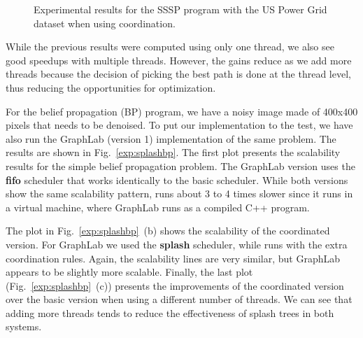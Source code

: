 \begin{figure}[h!]
     \centering
   \caption{Experimental results for the SSSP program with the US Power Grid dataset when using coordination.}
   \label{exp:sssp-uspowergrid}
\end{figure}

While the previous results were computed using only one thread, we also see good speedups with multiple threads. However, the gains reduce as we add
more threads because the decision of picking the best path is done at the thread level, thus reducing the opportunities for optimization.

For the belief propagation (BP) program, we have a noisy image made of 400x400 pixels that needs to be denoised.
To put our implementation to the test, we have also run the GraphLab (version 1) implementation of the same problem. The results are shown
in Fig.~\ref{exp:splashbp}. The first plot presents the scalability results for the simple belief propagation problem. The GraphLab version
uses the \textbf{fifo} scheduler that works identically to the basic \lang scheduler. While both versions show the same scalability pattern,
\lang runs about 3 to 4 times slower since it runs in a virtual machine, where GraphLab runs as a compiled C++ program.

\begin{figure*}[ht]
   \centering
   \caption{Experimental results for belief propagation with coordination using splashes. The dataset is a 400x400 image.}
   \label{exp:splashbp}
\end{figure*}

The plot in Fig.~\ref{exp:splashbp}~(b) shows the scalability of the coordinated version. For GraphLab we used the \textbf{splash} scheduler, while \lang
runs with the extra coordination rules. Again, the scalability lines are very similar, but GraphLab appears to be slightly more scalable.
Finally, the last plot (Fig.~\ref{exp:splashbp}~(c)) presents the improvements of the coordinated version over the basic version when using a different
number of threads. We can see that adding more threads tends to reduce the effectiveness of splash trees in both systems.

